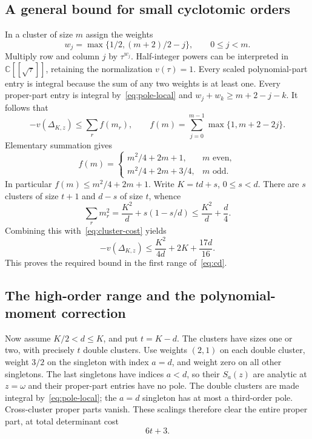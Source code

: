 \documentclass[11pt]{article}
\theoremstyle{remark}
\newcommand{\C}{\mathbb C}
\begin{document}
\subsection{A general bound for small cyclotomic orders}

In a cluster of size $m$ assign the weights
\[
 w_j=\max\{1/2,(m+2)/2-j\},\qquad 0\le j<m.
\]
Multiply row and column $j$ by $\tau^{w_j}$. Half-integer powers can
be interpreted in $\C[[\sqrt\tau]]$, retaining the normalization
$v(\tau)=1$. Every scaled polynomial-part entry is integral because
the sum of any two weights is at least one. Every proper-part entry
is integral by~\eqref{eq:pole-local} and
$w_j+w_k\ge m+2-j-k$.
It follows that
\begin{equation}\label{eq:cluster-cost}
 -v(\Delta_{K,z})\le\sum_r f(m_r),\qquad
 f(m)=\sum_{j=0}^{m-1}\max\{1,m+2-2j\}.
\end{equation}
Elementary summation gives
\[
 f(m)=\begin{cases}
 m^2/4+2m+1,&m\text{ even},\\
 m^2/4+2m+3/4,&m\text{ odd}.
 \end{cases}
\]
In particular $f(m)\le m^2/4+2m+1$. Write $K=td+s$, $0\le s<d$.
There are $s$ clusters of size $t+1$ and $d-s$ of size $t$, whence
\[
 \sum_r m_r^2=\frac{K^2}{d}+s(1-s/d)
 \le\frac{K^2}{d}+\frac d4.
\]
Combining this with~\eqref{eq:cluster-cost} yields
\begin{equation}\label{eq:low-order}
 -v(\Delta_{K,z})\le\frac{K^2}{4d}+2K+\frac{17d}{16}.
\end{equation}
This proves the required bound in the first range of~\eqref{eq:cd}.

\subsection{The high-order range and the polynomial-moment correction}

Now assume $K/2<d\le K$, and put $t=K-d$. The clusters have sizes one
or two, with precisely $t$ double clusters. Use weights $(2,1)$ on
each double cluster, weight $3/2$ on the singleton with index $a=d$,
and weight zero on all other singletons. The last singletons have
indices $a<d$, so their $S_a(z)$ are analytic at $z=\omega$ and their
proper-part entries have no pole. The double clusters are made
integral by~\eqref{eq:pole-local}; the $a=d$ singleton has at most a
third-order pole. Cross-cluster proper parts vanish. These scalings
therefore clear the entire proper part, at total determinant cost
\begin{equation}\label{eq:high-scale}
 6t+3.
\end{equation}
\end{document}

